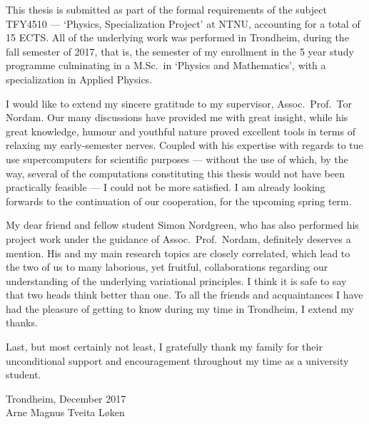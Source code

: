 This thesis is submitted as part of the formal requirements of the subject
TFY4510 --- `Physics, Specialization Project' at NTNU, accounting for a total
of 15 ECTS. All of the underlying work was performed in Trondheim, during the
fall semester of 2017, that is, the  semester of my enrollment in the
5 year study programme culminating in a M.Sc.\ in `Physics and Mathematics',
with a specialization in Applied Physics.

I would like to extend my sincere gratitude to my supervisor, Assoc.\ Prof.\
Tor Nordam. Our many discussions have provided me with great insight, while
his great knowledge, humour and youthful nature proved excellent tools in terms
of relaxing my early-semester nerves.
Coupled with his expertise with regards to tue use supercomputers for scientific
purposes --- without the use of which, by the
way, several of the computations constituting this thesis would not have been
practically feasible --- I could not be more satisfied. I am already looking
forwards to the continuation of our cooperation, for the upcoming spring term.

My dear friend and fellow student Simon Nordgreen, who has also performed his
project work under the guidance of Assoc.\ Prof.\ Nordam, definitely
deserves a mention. His and my main research topics are closely correlated,
which lead to the two of us to many laborious, yet fruitful, collaborations
regarding our understanding of the underlying variational principles. I think it
is safe to say that two heads think better than one. To all the friends and
acquaintances I have had the pleasure of getting to know during my
time in Trondheim, I extend my thanks.

Last, but most certainly not least, I gratefully thank my family for their
unconditional support and encouragement throughout my time as a university
student.


\begin{minipage}[t]{\textwidth}
    \begin{flushright}
    Trondheim, December 2017\\
    Arne Magnus Tveita Løken
    \end{flushright}
\end{minipage}\\[2cm]


